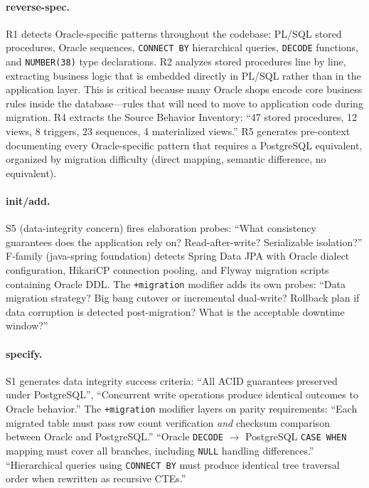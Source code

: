 \documentclass[11pt,a4paper,openright,twoside]{report}
\begin{document}
\paragraph{reverse-spec.}
R1 detects Oracle-specific patterns throughout the codebase: PL/SQL stored procedures, Oracle sequences, \texttt{CONNECT BY} hierarchical queries, \texttt{DECODE} functions, and \texttt{NUMBER(38)} type declarations. R2 analyzes stored procedures line by line, extracting business logic that is embedded directly in PL/SQL rather than in the application layer. This is critical because many Oracle shops encode core business rules inside the database---rules that will need to move to application code during migration. R4 extracts the Source Behavior Inventory: ``47 stored procedures, 12 views, 8 triggers, 23 sequences, 4 materialized views.'' R5 generates pre-context documenting every Oracle-specific pattern that requires a PostgreSQL equivalent, organized by migration difficulty (direct mapping, semantic difference, no equivalent).

\paragraph{init/add.}
S5 (data-integrity concern) fires elaboration probes: ``What consistency guarantees does the application rely on? Read-after-write? Serializable isolation?'' F-family (java-spring foundation) detects Spring Data JPA with Oracle dialect configuration, HikariCP connection pooling, and Flyway migration scripts containing Oracle DDL. The \texttt{+migration} modifier adds its own probes: ``Data migration strategy? Big bang cutover or incremental dual-write? Rollback plan if data corruption is detected post-migration? What is the acceptable downtime window?''

\paragraph{specify.}
S1 generates data integrity success criteria: ``All ACID guarantees preserved under PostgreSQL'', ``Concurrent write operations produce identical outcomes to Oracle behavior.'' The \texttt{+migration} modifier layers on parity requirements: ``Each migrated table must pass row count verification \emph{and} checksum comparison between Oracle and PostgreSQL.'' ``Oracle \texttt{DECODE} $\to$ PostgreSQL \texttt{CASE WHEN} mapping must cover all branches, including \texttt{NULL} handling differences.'' ``Hierarchical queries using \texttt{CONNECT BY} must produce identical tree traversal order when rewritten as recursive CTEs.''
\end{document}

